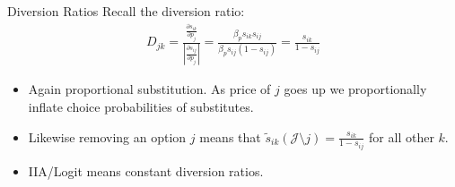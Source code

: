 \begin{frame}{Diversion Ratios}
Recall the diversion ratio:
\begin{align*}
D_{jk} =\frac{\frac{\partial s_{ik}}{\partial p_{j}}}{\left |\frac{\partial s_{ij}}{\partial p_{j}} \right|} = \frac{\beta_p s_{ik} s_{ij}}{\beta_p s_{ij} (1-s_{ij})} = \frac{s_{ik}}{1-s_{ij}}
\end{align*}
\begin{itemize}
\item Again proportional substitution. As price of $j$ goes up we proportionally inflate choice probabilities of substitutes.
\item Likewise removing an option $j$ means that $\tilde{s}_{ik}(\mathcal{J} \setminus j) = \frac{s_{ik}}{1-s_{ij}}$ for all other $k$.
\item IIA/Logit means \alert{constant diversion ratios}.
\end{itemize}
\end{frame}
%
%
%
%
%
%
%
